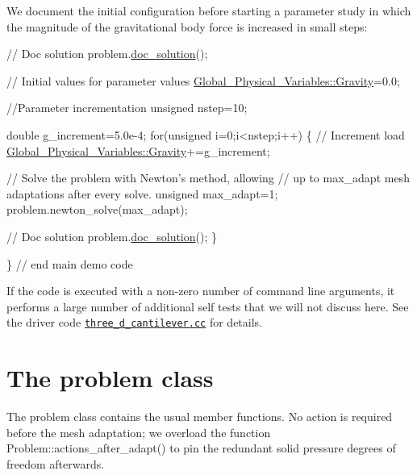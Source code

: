 We document the initial configuration before starting a parameter study in which the magnitude of the gravitational body force is increased in small steps\+:


\begin{DoxyCodeInclude}
   
   \textcolor{comment}{// Doc solution}
   problem.\hyperlink{classCantileverProblem_a7571348f8724e71be4e67dc64cea3877}{doc\_solution}();
   
   \textcolor{comment}{// Initial values for parameter values}
   \hyperlink{namespaceGlobal__Physical__Variables_a8b80d3e8d63b8d0a0ed435a2dd7fe2ad}{Global\_Physical\_Variables::Gravity}=0.0;
   
   \textcolor{comment}{//Parameter incrementation}
   \textcolor{keywordtype}{unsigned} nstep=10; 
   
   \textcolor{keywordtype}{double} g\_increment=5.0e-4;   
   \textcolor{keywordflow}{for}(\textcolor{keywordtype}{unsigned} i=0;i<nstep;i++)
    \{
     \textcolor{comment}{// Increment load}
     \hyperlink{namespaceGlobal__Physical__Variables_a8b80d3e8d63b8d0a0ed435a2dd7fe2ad}{Global\_Physical\_Variables::Gravity}+=g\_increment;
     
     \textcolor{comment}{// Solve the problem with Newton's method, allowing}
     \textcolor{comment}{// up to max\_adapt mesh adaptations after every solve.}
     \textcolor{keywordtype}{unsigned} max\_adapt=1;   
     problem.newton\_solve(max\_adapt);
     
     \textcolor{comment}{// Doc solution}
     problem.\hyperlink{classCantileverProblem_a7571348f8724e71be4e67dc64cea3877}{doc\_solution}();    
    \}

  \} \textcolor{comment}{// end main demo code}

\end{DoxyCodeInclude}


If the code is executed with a non-\/zero number of command line arguments, it performs a large number of additional self tests that we will not discuss here. See the driver code \href{../../../../demo_drivers/solid/three_d_cantilever/three_d_cantilever.cc}{\tt three\+\_\+d\+\_\+cantilever.\+cc} for details.



 

\hypertarget{index_class}{}\section{The problem class}\label{index_class}
The problem class contains the usual member functions. No action is required before the mesh adaptation; we overload the function {\ttfamily Problem\+::actions\+\_\+after\+\_\+adapt()} to pin the redundant solid pressure degrees of freedom afterwards.

